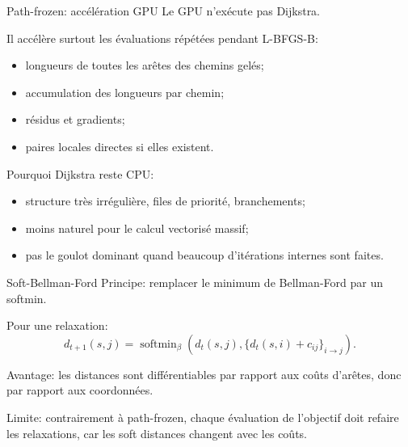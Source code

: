 \documentclass[aspectratio=169]{beamer}
\begin{document}
\begin{frame}{Path-frozen: accélération GPU}
  Le GPU n'exécute pas Dijkstra.

  \vspace{0.2cm}
  Il accélère surtout les évaluations répétées pendant L-BFGS-B:
  \begin{itemize}
    \item longueurs de toutes les arêtes des chemins gelés;
    \item accumulation des longueurs par chemin;
    \item résidus et gradients;
    \item paires locales directes si elles existent.
  \end{itemize}

  \vspace{0.2cm}
  Pourquoi Dijkstra reste CPU:
  \begin{itemize}
    \item structure très irrégulière, files de priorité, branchements;
    \item moins naturel pour le calcul vectorisé massif;
    \item pas le goulot dominant quand beaucoup d'itérations internes sont faites.
  \end{itemize}
\end{frame}

\begin{frame}{Soft-Bellman-Ford}
  Principe: remplacer le minimum de Bellman-Ford par un softmin.

  \vspace{0.2cm}
  Pour une relaxation:
  \[
    d_{t+1}(s,j)
    =
    \operatorname{softmin}_\beta
    \left(
      d_t(s,j),
      \{d_t(s,i)+c_{ij}\}_{i\to j}
    \right).
  \]

  \vspace{0.2cm}
  Avantage: les distances sont différentiables par rapport aux coûts d'arêtes,
  donc par rapport aux coordonnées.

  \vspace{0.2cm}
  Limite: contrairement à path-frozen, chaque évaluation de l'objectif doit
  refaire les relaxations, car les soft distances changent avec les coûts.
\end{frame}
\end{document}
